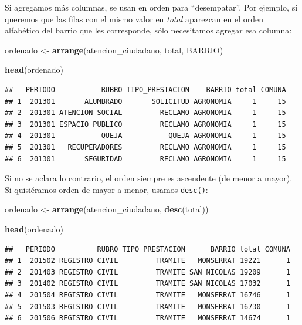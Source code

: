 \documentclass[]{book}
\newenvironment{Shaded}{\begin{snugshade}}{\end{snugshade}}
\newcommand{\KeywordTok}[1]{\textcolor[rgb]{0.13,0.29,0.53}{\textbf{#1}}}
\newcommand{\StringTok}[1]{\textcolor[rgb]{0.31,0.60,0.02}{#1}}
\newcommand{\NormalTok}[1]{#1}
\begin{document}
Si agregamos más columnas, se usan en orden para ``desempatar''. Por
ejemplo, si queremos que las filas con el mismo valor en \emph{total}
aparezcan en el orden alfabético del barrio que les corresponde, sólo
necesitamos agregar esa columna:

\begin{Shaded}
\begin{Highlighting}[]
\NormalTok{ordenado <-}\StringTok{ }\KeywordTok{arrange}\NormalTok{(atencion_ciudadano, total, BARRIO)}

\KeywordTok{head}\NormalTok{(ordenado)}
\end{Highlighting}
\end{Shaded}

\begin{verbatim}
##   PERIODO           RUBRO TIPO_PRESTACION    BARRIO total COMUNA
## 1  201301       ALUMBRADO       SOLICITUD AGRONOMIA     1     15
## 2  201301 ATENCION SOCIAL         RECLAMO AGRONOMIA     1     15
## 3  201301 ESPACIO PUBLICO         RECLAMO AGRONOMIA     1     15
## 4  201301           QUEJA           QUEJA AGRONOMIA     1     15
## 5  201301   RECUPERADORES         RECLAMO AGRONOMIA     1     15
## 6  201301       SEGURIDAD         RECLAMO AGRONOMIA     1     15
\end{verbatim}

Si no se aclara lo contrario, el orden siempre es ascendente (de menor a
mayor). Si quisiéramos orden de mayor a menor, usamos \texttt{desc()}:

\begin{Shaded}
\begin{Highlighting}[]
\NormalTok{ordenado <-}\StringTok{ }\KeywordTok{arrange}\NormalTok{(atencion_ciudadano, }\KeywordTok{desc}\NormalTok{(total))}

\KeywordTok{head}\NormalTok{(ordenado)}
\end{Highlighting}
\end{Shaded}

\begin{verbatim}
##   PERIODO          RUBRO TIPO_PRESTACION      BARRIO total COMUNA
## 1  201502 REGISTRO CIVIL         TRAMITE   MONSERRAT 19221      1
## 2  201403 REGISTRO CIVIL         TRAMITE SAN NICOLAS 19209      1
## 3  201402 REGISTRO CIVIL         TRAMITE SAN NICOLAS 17032      1
## 4  201504 REGISTRO CIVIL         TRAMITE   MONSERRAT 16746      1
## 5  201503 REGISTRO CIVIL         TRAMITE   MONSERRAT 16730      1
## 6  201506 REGISTRO CIVIL         TRAMITE   MONSERRAT 14674      1
\end{verbatim}
\end{document}
